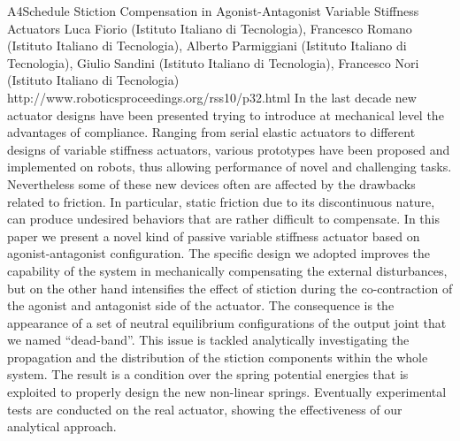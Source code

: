 \begin{spacing}{1.0}
\descriptionPaper
{A4}{Schedule}
{
Stiction Compensation in Agonist-Antagonist Variable Stiffness Actuators
}
{
Luca Fiorio (Istituto Italiano di Tecnologia), Francesco Romano (Istituto Italiano di Tecnologia), Alberto Parmiggiani (Istituto Italiano di Tecnologia), Giulio Sandini (Istituto Italiano di Tecnologia), Francesco Nori (Istituto Italiano di Tecnologia)
}
{
http://www.roboticsproceedings.org/rss10/p32.html
}
{
In the last decade new actuator designs have been presented trying to introduce at mechanical level the advantages of compliance. Ranging from serial elastic actuators to different designs of variable stiffness actuators, various prototypes have been proposed and implemented on robots, thus allowing performance of novel and challenging tasks. Nevertheless some of these new devices often are affected by the drawbacks related to friction. In particular, static friction due to its discontinuous nature, can produce undesired behaviors that are rather difficult to compensate. In this paper we present a novel kind of passive variable stiffness actuator based on agonist-antagonist configuration. The specific design we adopted improves the capability of the system in mechanically compensating the external disturbances, but on the other hand intensifies the effect of stiction during the co-contraction of the agonist and antagonist side of the actuator. The consequence is the appearance of a set of neutral equilibrium configurations of the output joint that we named ``dead-band''. This issue is tackled analytically investigating the propagation and the distribution of the stiction components within the whole system. The result is a condition over the spring potential energies that is exploited to properly design the new non-linear springs. Eventually experimental tests are conducted on the real actuator, showing the effectiveness of our analytical approach.
}



\end{spacing}
